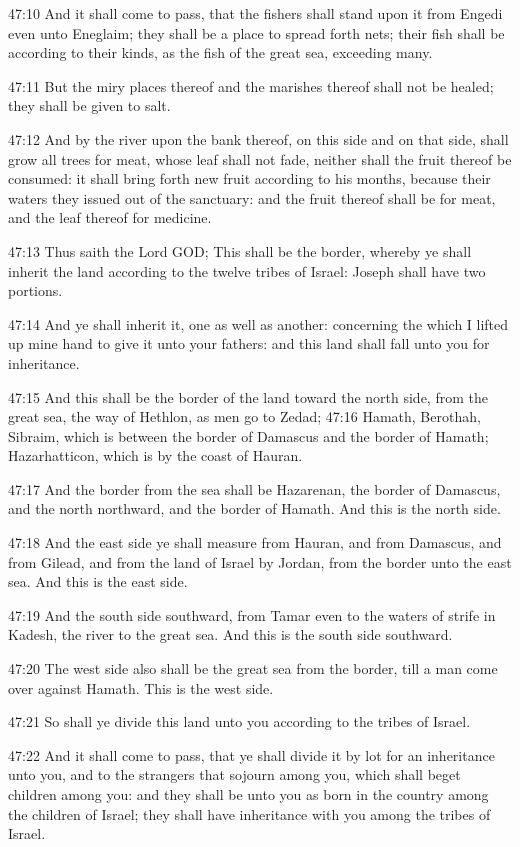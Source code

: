 47:10 And it shall come to pass, that the fishers shall stand upon it
from Engedi even unto Eneglaim; they shall be a place to spread forth
nets; their fish shall be according to their kinds, as the fish of the
great sea, exceeding many.

47:11 But the miry places thereof and the marishes thereof shall not
be healed; they shall be given to salt.

47:12 And by the river upon the bank thereof, on this side and on that
side, shall grow all trees for meat, whose leaf shall not fade,
neither shall the fruit thereof be consumed: it shall bring forth new
fruit according to his months, because their waters they issued out of
the sanctuary: and the fruit thereof shall be for meat, and the leaf
thereof for medicine.

47:13 Thus saith the Lord GOD; This shall be the border, whereby ye
shall inherit the land according to the twelve tribes of Israel:
Joseph shall have two portions.

47:14 And ye shall inherit it, one as well as another: concerning the
which I lifted up mine hand to give it unto your fathers: and this
land shall fall unto you for inheritance.

47:15 And this shall be the border of the land toward the north side,
from the great sea, the way of Hethlon, as men go to Zedad; 47:16
Hamath, Berothah, Sibraim, which is between the border of Damascus and
the border of Hamath; Hazarhatticon, which is by the coast of Hauran.

47:17 And the border from the sea shall be Hazarenan, the border of
Damascus, and the north northward, and the border of Hamath. And this
is the north side.

47:18 And the east side ye shall measure from Hauran, and from
Damascus, and from Gilead, and from the land of Israel by Jordan, from
the border unto the east sea. And this is the east side.

47:19 And the south side southward, from Tamar even to the waters of
strife in Kadesh, the river to the great sea. And this is the south
side southward.

47:20 The west side also shall be the great sea from the border, till
a man come over against Hamath. This is the west side.

47:21 So shall ye divide this land unto you according to the tribes of
Israel.

47:22 And it shall come to pass, that ye shall divide it by lot for an
inheritance unto you, and to the strangers that sojourn among you,
which shall beget children among you: and they shall be unto you as
born in the country among the children of Israel; they shall have
inheritance with you among the tribes of Israel.

